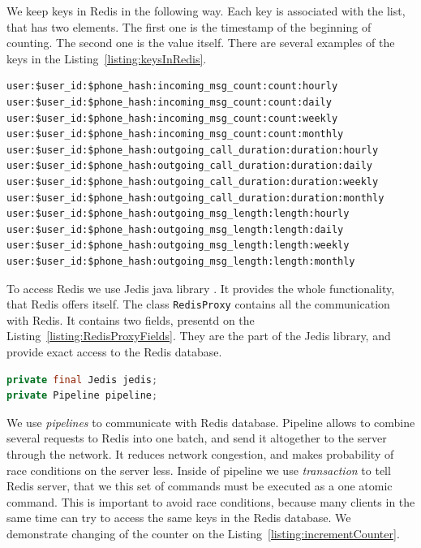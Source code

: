 We keep keys in Redis in the following way.
Each key is associated with the list, that has two elements.
The first one is the timestamp of the beginning of counting.
The second one is the value itself.
There are several examples of the keys in the Listing~\ref{listing:keysInRedis}.

\begin{lstlisting}[float=h, caption=Examples of the keys in Redis., label=listing:keysInRedis]
user:$user_id:$phone_hash:incoming_msg_count:count:hourly
user:$user_id:$phone_hash:incoming_msg_count:count:daily
user:$user_id:$phone_hash:incoming_msg_count:count:weekly
user:$user_id:$phone_hash:incoming_msg_count:count:monthly
user:$user_id:$phone_hash:outgoing_call_duration:duration:hourly
user:$user_id:$phone_hash:outgoing_call_duration:duration:daily
user:$user_id:$phone_hash:outgoing_call_duration:duration:weekly
user:$user_id:$phone_hash:outgoing_call_duration:duration:monthly
user:$user_id:$phone_hash:outgoing_msg_length:length:hourly
user:$user_id:$phone_hash:outgoing_msg_length:length:daily
user:$user_id:$phone_hash:outgoing_msg_length:length:weekly
user:$user_id:$phone_hash:outgoing_msg_length:length:monthly
\end{lstlisting}

To access Redis we use Jedis java library \cite{Jedis}.
It provides the whole functionality, that Redis offers itself.
The class \lstinline{RedisProxy} contains all the communication with Redis.
It contains two fields, presentd on the Listing~\ref{listing:RedisProxyFields}.
They are the part of the Jedis library, and provide exact access to the Redis database.

\begin{lstlisting}[float=h, caption=Two main fields of the class RedisProxy., label=listing:RedisProxyFields, language=Java]
private final Jedis jedis;
private Pipeline pipeline;
\end{lstlisting}

We use \textit{pipelines} to communicate with Redis database.
Pipeline allows to combine several requests to Redis into one batch, and send it altogether to the server through the network.
It reduces network congestion, and makes probability of race conditions on the server less.
Inside of pipeline we use \textit{transaction} to tell Redis server, that we this set of commands must be executed as a one atomic command.
This is important to avoid race conditions, because many clients in the same time can try to access the same keys in the Redis database.
We demonstrate changing of the counter on the Listing~\ref{listing:incrementCounter}.

